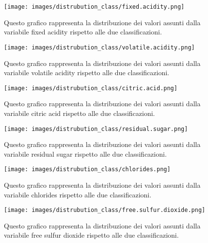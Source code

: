 \begin{figure}[H]
    \centering
    \texttt{[image: images/distrubution\_class/fixed.acidity.png]}
    \caption{Questo grafico rappresenta la distribuzione dei valori assunti dalla variabile fixed acidity rispetto alle due classificazioni.}
    \label{fig:distrubution_class_fixed.acidity}
\end{figure}

\begin{figure}[H]
    \centering
    \texttt{[image: images/distrubution\_class/volatile.acidity.png]}
    \caption{Questo grafico rappresenta la distribuzione dei valori assunti dalla variabile volatile acidity rispetto alle due classificazioni.}
    \label{fig:distrubution_class_volatile.acidity}
\end{figure}

\begin{figure}[H]
    \centering
    \texttt{[image: images/distrubution\_class/citric.acid.png]}
    \caption{Questo grafico rappresenta la distribuzione dei valori assunti dalla variabile citric acid rispetto alle due classificazioni.}
    \label{fig:distrubution_class_citric.acid}
\end{figure}

\begin{figure}[H]
    \centering
    \texttt{[image: images/distrubution\_class/residual.sugar.png]}
    \caption{Questo grafico rappresenta la distribuzione dei valori assunti dalla variabile residual sugar rispetto alle due classificazioni.}
    \label{fig:distrubution_class_residual.sugar}
\end{figure}

\begin{figure}[H]
    \centering
    \texttt{[image: images/distrubution\_class/chlorides.png]}
    \caption{Questo grafico rappresenta la distribuzione dei valori assunti dalla variabile chlorides rispetto alle due classificazioni.}
    \label{fig:distrubution_class_chlorides}
\end{figure}

\begin{figure}[H]
    \centering
    \texttt{[image: images/distrubution\_class/free.sulfur.dioxide.png]}
    \caption{Questo grafico rappresenta la distribuzione dei valori assunti dalla variabile free sulfur dioxide rispetto alle due classificazioni.}
    \label{fig:distrubution_class_free.sulfur.dioxide}
\end{figure}

